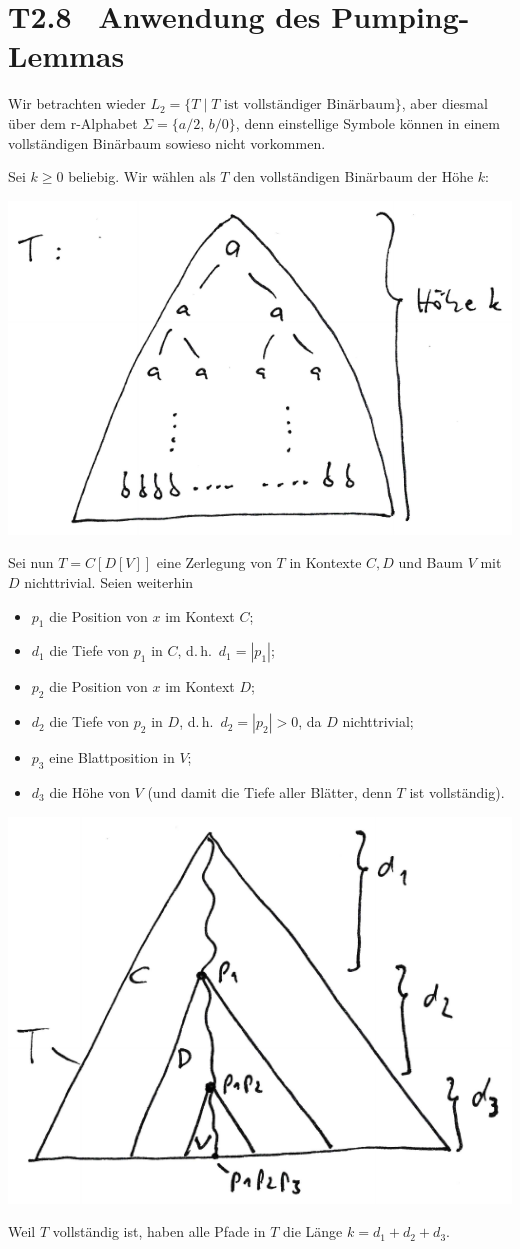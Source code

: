 \documentclass[fontsize=11pt, twoside=false, numbers=autoenddot]{scrbook}
\begin{document}
\pagebreak
\section*{T2.8~ Anwendung des Pumping-Lemmas}

Wir betrachten wieder $L_2 = \{T \mid \text{$T$ ist vollständiger Binärbaum}\}$,
aber diesmal über dem r-Alphabet $\Sigma = \{a/2,\,b/0\}$,
denn einstellige Symbole können in einem vollständigen Binärbaum sowieso nicht vorkommen.

Sei $k \geq 0$ beliebig.
Wir wählen als $T$ den vollständigen Binärbaum der Höhe $k$:
%
\begin{center}
  \includegraphics[width=.5\linewidth]{img/t2_8a.pdf}%
\end{center}
%
Sei nun $T=C[D[V]]$ eine Zerlegung von $T$ in Kontexte
$C,D$ und Baum $V$ mit $D$ nichttrivial.
Seien weiterhin
%
\begin{itemize}
  \item
    $p_1$ die Position von $x$ im Kontext $C$;
  \item
    $d_1$ die Tiefe von $p_1$ in $C$, d.\,h.\ $d_1 = |p_1|$;
  \item
    $p_2$ die Position von $x$ im Kontext $D$;
  \item
    $d_2$ die Tiefe von $p_2$ in $D$, d.\,h.\ $d_2 = |p_2| > 0$, da $D$ nichttrivial;
  \item
    $p_3$ eine Blattposition in $V$;
  \item
    $d_3$ die Höhe von $V$ (und damit die Tiefe aller Blätter, denn $T$ ist vollständig).
\end{itemize}
%
\begin{center}
  \includegraphics[width=.5\linewidth]{img/t2_8b.pdf}%
\end{center}
%
Weil $T$ vollständig ist, haben alle Pfade in $T$ die Länge $k = d_1+d_2+d_3$.
\end{document}
